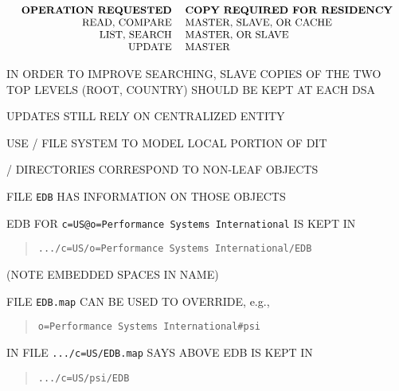 \begin{bwslide}

\[\small\begin{tabular}{rl}
\bf OPERATION REQUESTED&
		\bf COPY REQUIRED FOR RESIDENCY\\
READ, COMPARE&	MASTER, SLAVE, OR CACHE\\
LIST, SEARCH&	MASTER, OR SLAVE\\
UPDATE&		MASTER\\
\end{tabular}\]

\begin{nrtc}
\item	IN ORDER TO IMPROVE SEARCHING,
	SLAVE COPIES OF THE TWO TOP LEVELS (ROOT, COUNTRY) SHOULD BE KEPT AT
	EACH DSA

\item	UPDATES STILL RELY ON CENTRALIZED ENTITY
\end{nrtc}
\end{bwslide}


\begin{bwslide}

\begin{nrtc}
\item	USE \unix/ FILE SYSTEM TO MODEL LOCAL PORTION OF DIT
    \begin{nrtc}
    \item	\unix/ DIRECTORIES CORRESPOND TO NON-LEAF OBJECTS

    \item	FILE \verb"EDB" HAS INFORMATION ON THOSE OBJECTS
    \end{nrtc}

\item	EDB FOR \verb"c=US@o=Performance Systems International" IS KEPT IN
\begin{quote}\small\begin{verbatim}
.../c=US/o=Performance Systems International/EDB
\end{verbatim}\end{quote}
(NOTE EMBEDDED SPACES IN NAME)

\item	FILE \verb"EDB.map" CAN BE USED TO OVERRIDE, e.g.,
\begin{quote}\small\begin{verbatim}
o=Performance Systems International#psi
\end{verbatim}\end{quote}
IN FILE \verb".../c=US/EDB.map" SAYS ABOVE EDB IS KEPT IN
\begin{quote}\small\begin{verbatim}
.../c=US/psi/EDB
\end{verbatim}\end{quote}
\end{nrtc}
\end{bwslide}


